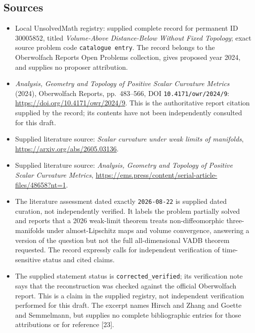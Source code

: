 \documentclass[11pt]{article}
\begin{document}
\subsection{Sources}
\begin{itemize}
\item Local UnsolvedMath registry: supplied complete record for permanent ID \(30005852\), titled \emph{Volume-Above Distance-Below Without Fixed Topology}; exact source problem code \texttt{catalogue entry}. The record belongs to the Oberwolfach Reports Open Problems collection, gives proposed year 2024, and supplies no proposer attribution.
\item \emph{Analysis, Geometry and Topology of Positive Scalar Curvature Metrics} (2024), Oberwolfach Reports, pp.\ 483--566, DOI \texttt{10.4171/owr/2024/9}: \url{https://doi.org/10.4171/owr/2024/9}. This is the authoritative report citation supplied by the record; its contents have not been independently consulted for this draft.
\item Supplied literature source: \emph{Scalar curvature under weak limits of manifolds}, \url{https://arxiv.org/abs/2605.03136}.
\item Supplied literature source: \emph{Analysis, Geometry and Topology of Positive Scalar Curvature Metrics}, \url{https://ems.press/content/serial-article-files/48658?nt=1}.
\item The literature assessment dated exactly \texttt{2026-08-22} is supplied dated curation, not independently verified. It labels the problem partially solved and reports that a 2026 weak-limit theorem treats non-diffeomorphic three-manifolds under almost-Lipschitz maps and volume convergence, answering a version of the question but not the full all-dimensional VADB theorem requested. The record expressly calls for independent verification of time-sensitive status and cited claims.
\item The supplied statement status is \texttt{corrected\_verified}; its verification note says that the reconstruction was checked against the official Oberwolfach report. This is a claim in the supplied registry, not independent verification performed for this draft. The excerpt names Hirsch and Zhang and Goette and Semmelmann, but supplies no complete bibliographic entries for those attributions or for reference [23].
\end{itemize}
\end{document}
